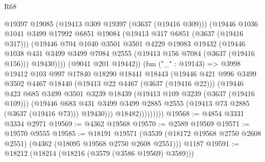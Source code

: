 \begin{lexlean}{R68}
\begin{coremodule}
                        @19397
                        @19085
                        (@19413 @309 @19397 (@3637 (@19416 @309)))
                        (@19446
                          @1036
                          @1041
                          @3499
                          @17992
                          @6851
                          @19084
                          (@19413 @317 @6851 (@3637 (@19416 @317)))
                          (@19446
                            @704
                            @1040
                            @3501
                            @3501
                            @4229
                            @19083
                            @19432
                            (@19446
                              @1038
                              @431
                              @3499
                              @3499
                              @7084
                              @2555
                              (@19413 @156 @7084 (@3637 (@19416 @156)))
                              @19430))))
                      (@9041 @201 @19442))
                    (fun ("_" : @19143) =>
                    @3998
                      @19412
                      @103
                      @997
                      @17840
                      @18290
                      @18441
                      @18443
                      (@19446
                        @421
                        @996
                        @3499
                        @3502
                        @4467
                        @18440
                        (@19413 @22 @4467 (@3637 (@19416 @22)))
                        (@19446
                          @423
                          @685
                          @3499
                          @3501
                          @3239
                          @18439
                          (@19413 @109 @3239 (@3637 (@19416 @109)))
                          (@19446
                            @683
                            @431
                            @3499
                            @3499
                            @2885
                            @2555
                            (@19413 @73 @2885 (@3637 (@19416 @73)))
                            @19430)))
                      @18482)))))))))
@19568 := @4854 @3331 @3334 @2971
@19569 := @4362 @19568
@19570 := @2589 @19569
@19571 := @19570 @9555
@19585 := @18191
    @19571
    (@3539 (@18172 @19568 @2750 @2608 @2551) (@4362 (@18095 @19568 @2750 @2608 @2551)))
    @1187
@19591 := @18212 (@18214 (@18216 (@3579 (@3586 @19569) @3589)))

\end{coremodule}
\end{lexlean}
